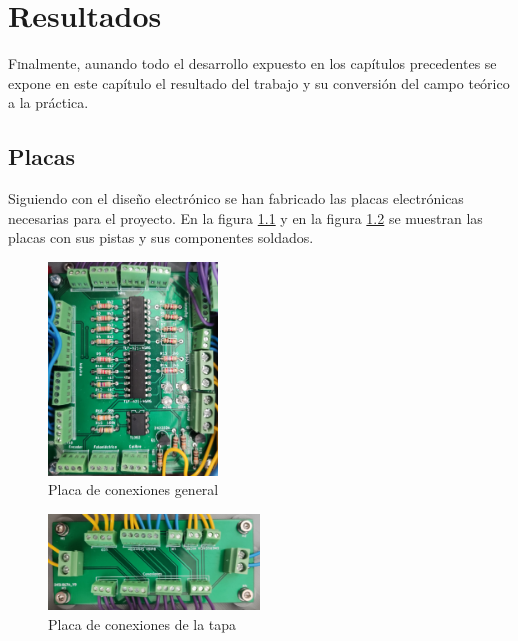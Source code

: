 \chapter{Resultados}\label{chp-07}

\lettrine[lraise=-0.1, lines=2, loversize=0.2]{F}inalmente, aunando todo el desarrollo expuesto en los capítulos precedentes se expone en este
capítulo el resultado del trabajo y su conversión del campo teórico a la práctica.

\section{Placas}

Siguiendo con el diseño electrónico se han fabricado las placas electrónicas necesarias para el proyecto.
En la figura \ref{fig:placafondo} y en la figura \ref{fig:placatapa} se muestran las placas con 
sus pistas y sus componentes soldados.

\begin{figure}[hbtp]%
    \centering 
        \includegraphics[width=0.4\textwidth]{07-resultados/placafondo.jpg}
    \caption{Placa de conexiones general}
    \label{fig:placafondo} 
\end{figure}

\begin{figure}[hbtp]%
    \centering 
        \includegraphics[width=0.5\textwidth]{07-resultados/placatapa.jpg}
    \caption{Placa de conexiones de la tapa}
    \label{fig:placatapa} 
\end{figure}

